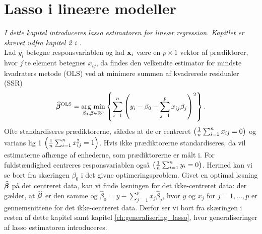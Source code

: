 \chapter{Lasso i lineære modeller} \label{ch:lasso}
\textit{I dette kapitel introduceres lasso estimatoren for lineær regression. 
Kapitlet er skrevet udfra kapitel 2 i \citep{hastie}.
} \\[4mm]
%
Lad \(y_i\) betegne responsvariablen og lad \(\mathbf{x}_i\) være en \(p \times 1\) vektor af prædiktorer, hvor \(j\)'te element betegnes \(x_{ij}\), da findes den velkendte estimator for mindste kvadraters metode (OLS) ved at minimere summen af kvadrerede residualer (SSR)
\begin{align}
\widehat{\tbeta}^\text{OLS} = \argmin_{\beta_0, \tbeta \in \R^p} \cbr{\sum_{i=1}^n \del{y_i - \beta_0 - \sum_{j=1}^p x_{ij} \beta_j}^2}. \label{eq:OLS}
\end{align}
%
Ofte standardiseres prædiktorerne, således at de er centreret \( \del{\frac{1}{n} \sum_{i=1}^n x_{ij} = 0}\) og varians lig 1 \( \del{\frac{1}{n} \sum_{i=1}^n x_{ij}^2=1}\).
Hvis ikke prædiktorerne standardiseres, da vil estimaterne afhænge af enhederne, som prædiktorerne er målt i.
For fuldstændighed centreres responsvariablen også \( \del{\frac{1}{n} \sum_{i=1}^n y_{i} = 0} \).
Hermed kan vi se bort fra skæringen $\beta_0$ i det givne optimeringsproblem.
Givet en optimal løsning \(\widehat{\boldsymbol{\beta}}\) på det centreret data, kan vi finde løsningen for det ikke-centreret data: der gælder, at \(\widehat{\boldsymbol{\beta}}\) er den samme og 
\(\widehat{\beta}_0 = \bar{y} - \sum_{j=1}^p \bar{x}_j \widehat{\beta}_j\), hvor \(\bar{y}\) og \(\bar{x}_j \) for \(j=1, \ldots, p\) er gennemsnittene for det ikke-centreret data.
Derfor ser vi bort fra skæringen i resten af dette kapitel samt kapitel \ref{ch:generalisering_lasso}, hvor generaliseringer af lasso estimatoren introduceres.

